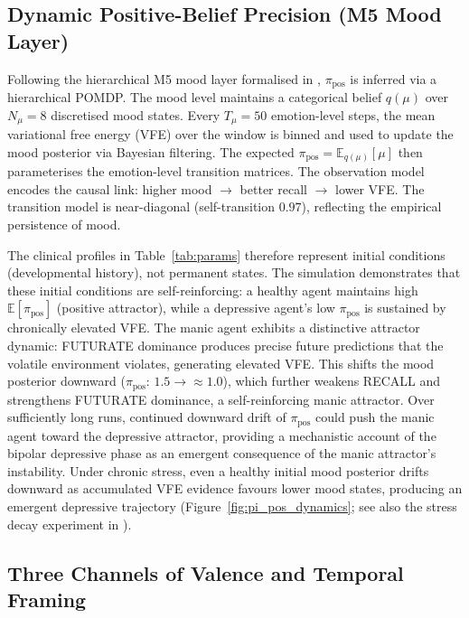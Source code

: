 \documentclass[11pt,a4paper]{article}
\begin{document}
\subsection{Dynamic Positive-Belief Precision (M5 Mood Layer)}

Following the hierarchical M5 mood layer formalised in \citet{albarracin2026temporal}, $\pi_{\text{pos}}$ is inferred via a hierarchical POMDP. The mood level maintains a categorical belief $q(\mu)$ over $N_\mu = 8$ discretised mood states. Every $T_\mu = 50$ emotion-level steps, the mean variational free energy (VFE) over the window is binned and used to update the mood posterior via Bayesian filtering. The expected $\pi_{\text{pos}} = \mathbb{E}_{q(\mu)}[\mu]$ then parameterises the emotion-level transition matrices. The observation model encodes the causal link: higher mood $\to$ better recall $\to$ lower VFE. The transition model is near-diagonal (self-transition $0.97$), reflecting the empirical persistence of mood.

The clinical profiles in Table~\ref{tab:params} therefore represent initial conditions (developmental history), not permanent states. The simulation demonstrates that these initial conditions are self-reinforcing: a healthy agent maintains high $\mathbb{E}[\pi_{\text{pos}}]$ (positive attractor), while a depressive agent's low $\pi_{\text{pos}}$ is sustained by chronically elevated VFE. The manic agent exhibits a distinctive attractor dynamic: FUTURATE dominance produces precise future predictions that the volatile environment violates, generating elevated VFE. This shifts the mood posterior downward ($\pi_{\text{pos}}$: $1.5 \to \approx 1.0$), which further weakens RECALL and strengthens FUTURATE dominance, a self-reinforcing manic attractor. Over sufficiently long runs, continued downward drift of $\pi_{\text{pos}}$ could push the manic agent toward the depressive attractor, providing a mechanistic account of the bipolar depressive phase as an emergent consequence of the manic attractor's instability. Under chronic stress, even a healthy initial mood posterior drifts downward as accumulated VFE evidence favours lower mood states, producing an emergent depressive trajectory (Figure~\ref{fig:pi_pos_dynamics}; see also the stress decay experiment in \citealt{albarracin2026temporal}).

\subsection{Three Channels of Valence and Temporal Framing}
\end{document}
